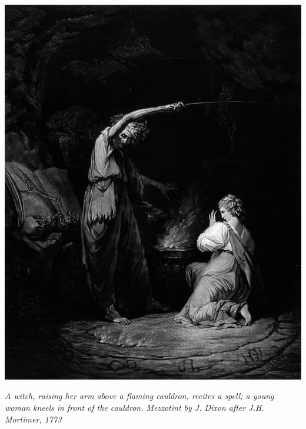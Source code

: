 \vfill

\medskip

\begin{center}
\includegraphics[width=0.5\linewidth]{immagini/potion2.png}
\smallskip

\emph{A witch, raising her arm above a flaming cauldron, recites a spell; a young woman kneels in front of the cauldron. Mezzotint by J. Dixon after J.H. Mortimer, 1773}
\end{center}


%

\pagebreak

\pagebreak

